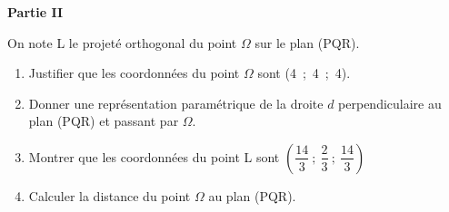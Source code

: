 \bigskip

\textbf{Partie II}

\medskip

On note L le projeté orthogonal du point $\Omega$ sur le plan (PQR).

\medskip

\begin{enumerate}
\item Justifier que les coordonnées du point $\Omega$ sont (4~;~4~;~4).
\item Donner une représentation paramétrique de la droite $d$ perpendiculaire au plan (PQR) et passant par $\Omega$.
\item Montrer que les coordonnées du point L sont $\left(\dfrac{14}{3}~;~ \dfrac{2}{3}~;~\dfrac{14}{3}\right)$
\item Calculer la distance du point $\Omega$ au plan (PQR).
\end{enumerate}


\bigskip

